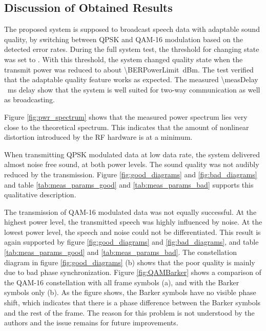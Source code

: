 

\subsection{Discussion of Obtained Results}
The proposed system is supposed to broadcast speech data with adaptable sound quality, by switching between QPSK and QAM-16 modulation based on the detected error rates. During the full system test, the threshold for changing state was set to \BERThreshold. With this threshold, the system changed quality state when the transmit power was reduced to about \SI{\BERPowerLimit}{dBm}. The test verified that the adaptable quality feature works as expected. The measured \SI{\measDelay }{ms} delay show that the system is well suited for two-way communication as well as broadcasting. 

Figure \ref{fig:pwr_spectrum} shows that the measured power spectrum lies very close to the theoretical spectrum. This indicates that the amount of nonlinear distortion introduced by the RF hardware is at a minimum.

When transmitting QPSK modulated data at low data rate, the system delivered almost noise free sound, at both power levels. The sound quality was not audibly reduced by the transmission. Figure \ref{fig:good_diagrams} and \ref{fig:bad_diagrams} and table \ref{tab:meas_params_good} and \ref{tab:meas_params_bad} supports this qualitative description. 

The transmission of QAM-16 modulated data was not equally successful. At the highest power level, the transmitted speech was highly influenced by noise. At the lowest power level, the speech and noise could not be differentiated. This result is again supported by figure \ref{fig:good_diagrams} and \ref{fig:bad_diagrams}, and table \ref{tab:meas_params_good} and \ref{tab:meas_params_bad}. The constellation diagram in figure \ref{fig:good_diagrams} (b) shows that the poor quality is mainly due to bad phase synchronization. Figure \ref{fig:QAMBarker} shows a comparison of the QAM-16 constellation with all frame symbols (a), and with the Barker symbols only (b). As the figure shows, the Barker symbols have no visible phase shift, which indicates that there is a phase difference between the Barker symbols and the rest of the frame. The reason for this problem is not understood by the authors and the issue remains for future improvements.

